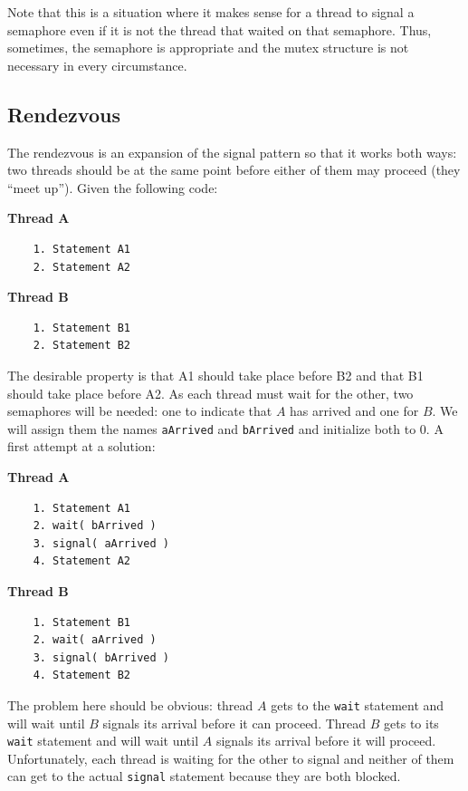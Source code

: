 Note that this is a situation where it makes sense for a thread to signal a semaphore even if it is not the thread that waited on that semaphore. Thus, sometimes, the semaphore is appropriate and the mutex structure is not necessary in every circumstance.

\subsection*{Rendezvous}
The rendezvous is an expansion of the signal pattern so that it works both ways: two threads should be at the same point before either of them may proceed (they ``meet up''). Given the following code:

\begin{multicols}{2}
\textbf{Thread A}\vspace{-2em}
  \begin{verbatim}
	1. Statement A1
	2. Statement A2
  \end{verbatim}
\columnbreak
\textbf{Thread B}\vspace{-2em}
  \begin{verbatim}
	1. Statement B1
	2. Statement B2
  \end{verbatim}
\end{multicols}
\vspace{-2em}

The desirable property is that A1 should take place before B2 and that B1 should take place before A2. As each thread must wait for the other, two semaphores will be needed: one to indicate that $A$ has arrived and one for $B$. We will assign them the names \texttt{aArrived} and \texttt{bArrived} and initialize both to 0. A first attempt at a solution:

\begin{multicols}{2}
\textbf{Thread A}\vspace{-2em}
  \begin{verbatim}
	1. Statement A1
	2. wait( bArrived )
	3. signal( aArrived )
	4. Statement A2
  \end{verbatim}
\columnbreak
\textbf{Thread B}\vspace{-2em}
  \begin{verbatim}
	1. Statement B1
	2. wait( aArrived )
	3. signal( bArrived )
	4. Statement B2
  \end{verbatim}
\end{multicols}
\vspace{-2em}


The problem here should be obvious: thread $A$ gets to the \texttt{wait} statement and will wait until $B$ signals its arrival before it can proceed. Thread $B$ gets to its \texttt{wait} statement and will wait until $A$ signals its arrival before it will proceed. Unfortunately, each thread is waiting for the other to signal and neither of them can get to the actual \texttt{signal} statement because they are both blocked. 

